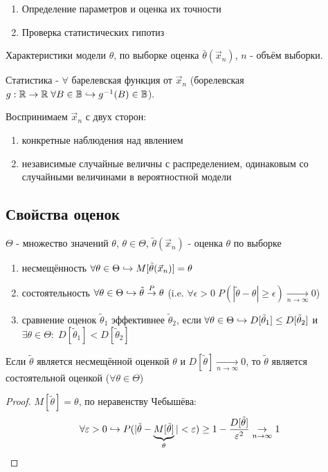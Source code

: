\documentclass{article}
\begin{document}
\begin{enumerate}
  \item Определение параметров и оценка их точности
  \item Проверка статистических гипотиз
\end{enumerate}

Характеристики модели $\theta$, по выборке оценка $\bar{\theta}(\vec{x}_n)$,
$n$ - объём выборки.

Статистика - $\forall$ барелевская функция от $\vec{x}_n$
(борелевская $g:\mathbb{R}\to\mathbb{R} \; \forall B\in \mathbb{B} \hookrightarrow g^{-1}(B)\in \mathbb{B}$).

Воспринимаем $\vec{x}_n$ с двух сторон:
\begin{enumerate}
  \item конкретные наблюдения над явлением
  \item независимые случайные величны с распределением, одинаковым со случайными величинами в вероятностной модели
\end{enumerate}

\subsection{Свойства оценок}
$\Theta$ - множество значений $\theta$, $\theta \in \Theta$, 
$\tilde{\theta}(\vec{x}_n)$ - оценка $\theta$ по выборке
\begin{enumerate}
  \item несмещённость $\forall\theta \in \Theta \hookrightarrow M[\tilde{\theta}(\vec{x}_n)]=\theta$
  \item состоятельность $\forall \theta \in \Theta \hookrightarrow \tilde{\theta} \overset{P}{\to}\theta$
    (i.e. $\forall \epsilon > 0 \; P(|\tilde{\theta}-\theta|\ge\epsilon)\underset{n\to\infty}{\to}0$)
  \item сравнение оценок $\tilde{\theta}_1$ эффективнее $\tilde{\theta}_2$,
    если $\forall \theta \in \Theta \hookrightarrow D[\tilde{\theta}_1] \le D[\tilde{\theta}_2]$
    и $\exists \theta \in \Theta : \; D[\tilde{\theta}_1] < D[\tilde{\theta}_2]$
\end{enumerate}
\begin{theorem}
  Если $\tilde{\theta}$ является несмещённой оценкой $\theta$ и $D[\tilde{\theta}]\underset{n\to\infty}{\to}0$, 
  то $\tilde{\theta}$ является состоятельной оценкой ($\forall \theta \in \Theta$)
\end{theorem}
\begin{proof}
  $M[\tilde{\theta}]=\theta$, по неравенству Чебышёва:
  \[
    \forall \varepsilon>0 \hookrightarrow P(|\tilde{\theta}-\underbrace{M[\tilde{\theta}]}_{\theta}| < \varepsilon) \ge 1 - \frac{D[\tilde{\theta}]}{\varepsilon^{2}} \underset{n\to\infty}{\to} 1
  \]
\end{proof}
\end{document}
